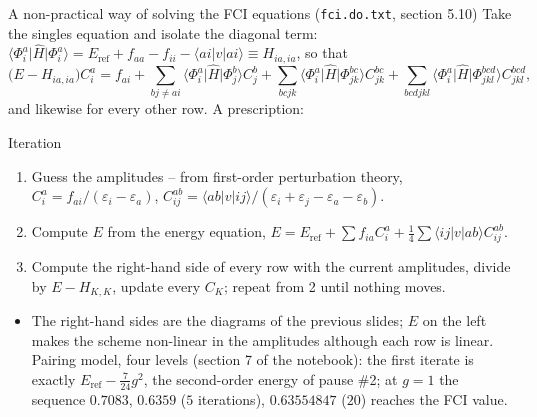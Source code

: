 \documentclass[aspectratio=169,10pt]{beamer}
\newcommand{\ket}[1]{\vert #1\rangle}
\newcommand{\bra}[1]{\langle #1\vert}
\newcommand{\element}[3]{\langle #1\vert #2\vert #3\rangle}
\begin{document}
\begin{frame}{A non-practical way of solving the FCI equations (\texttt{fci.do.txt}, section 5.10)}
  \footnotesize
  Take the singles equation and isolate the diagonal term: $\bra{\Phi_i^a}\hat{H}\ket{\Phi_i^a}=E_{\mathrm{ref}}+f_{aa}-f_{ii}-\element{ai}{v}{ai}\equiv H_{ia,ia}$, so that
  \[
    \bigl(E-H_{ia,ia}\bigr)C_i^a=f_{ai}+\sum_{bj\neq ai}\bra{\Phi_i^a}\hat{H}\ket{\Phi_j^b}C_j^b+\sum_{bcjk}\bra{\Phi_i^a}\hat{H}\ket{\Phi_{jk}^{bc}}C_{jk}^{bc}+\sum_{bcdjkl}\bra{\Phi_i^a}\hat{H}\ket{\Phi_{jkl}^{bcd}}C_{jkl}^{bcd},
  \]
  and likewise for every other row. A prescription:
  \begin{block}{Iteration}
    \begin{enumerate}
      \item Guess the amplitudes -- from first-order perturbation theory, $C_i^a=f_{ai}/(\varepsilon_i-\varepsilon_a)$, $C_{ij}^{ab}=\element{ab}{v}{ij}/(\varepsilon_i+\varepsilon_j-\varepsilon_a-\varepsilon_b)$.
      \item Compute $E$ from the energy equation, $E=E_{\mathrm{ref}}+\sum f_{ia}C_i^a+\frac14\sum\element{ij}{v}{ab}C_{ij}^{ab}$.
      \item Compute the right-hand side of every row with the current amplitudes, divide by $E-H_{K,K}$, update every $C_K$; repeat from 2 until nothing moves.
    \end{enumerate}
  \end{block}
  \begin{itemize}
    \item The right-hand sides are the diagrams of the previous slides; $E$ on the left makes the scheme \alert{non-linear} in the amplitudes although each row is linear. Pairing model, four levels (section 7 of the notebook): the \alert{first iterate is exactly} $E_{\mathrm{ref}}-\frac{7}{24}g^2$, the second-order energy of pause \#2; at $g=1$ the sequence $0.7083$, $0.6359$ ($5$ iterations), $0.63554847$ ($20$) reaches the FCI value.
  \end{itemize}
\end{frame}
\end{document}
